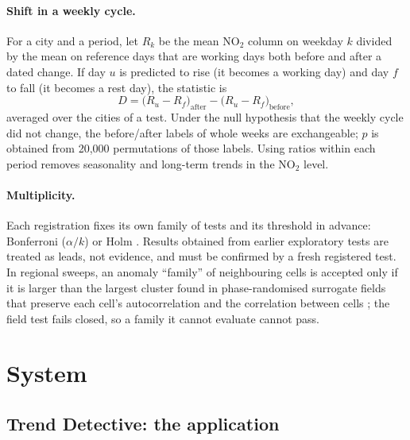 \documentclass[11pt,a4paper]{article}
\begin{document}
\paragraph{Shift in a weekly cycle.} For a city and a period, let $R_k$ be the mean NO$_2$ column on weekday $k$
divided by the mean on reference days that are working days both before and after a dated change. If day $u$ is
predicted to rise (it becomes a working day) and day $f$ to fall (it becomes a rest day), the statistic is
\begin{equation}
  D = \bigl(R_u - R_f\bigr)_{\mathrm{after}} - \bigl(R_u - R_f\bigr)_{\mathrm{before}},
  \label{eq:weekend}
\end{equation}
averaged over the cities of a test. Under the null hypothesis that the weekly cycle did not change, the
before/after labels of whole weeks are exchangeable; $p$ is obtained from 20{,}000 permutations of those labels.
Using ratios within each period removes seasonality and long-term trends in the NO$_2$ level.

\paragraph{Multiplicity.} Each registration fixes its own family of tests and its threshold in advance: Bonferroni
($\alpha/k$) or Holm \citep{holm1979}. Results obtained from earlier exploratory tests are treated as leads, not
evidence, and must be confirmed by a fresh registered test. In regional sweeps, an anomaly ``family'' of neighbouring
cells is accepted only if it is larger than the largest cluster found in phase-randomised surrogate fields that
preserve each cell's autocorrelation and the correlation between cells \citep{theiler1992}; the field test fails
closed, so a family it cannot evaluate cannot pass.

\section{System}
\label{sec:system}

\subsection{Trend Detective: the application}
\label{sec:app}
\end{document}
